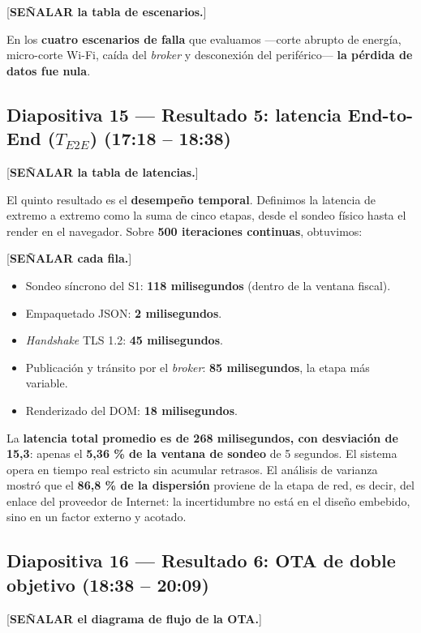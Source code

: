 \documentclass[11pt, a4paper]{article}
\begin{document}
[\textbf{SEÑALAR la tabla de escenarios.}]

En los \textbf{cuatro escenarios de falla} que evaluamos —corte abrupto de energía, micro-corte Wi-Fi, caída del \textit{broker} y desconexión del periférico— \textbf{la pérdida de datos fue nula}.

\subsection*{Diapositiva 15 — Resultado 5: latencia End-to-End ($T_{E2E}$) (17:18 – 18:38)}

[\textbf{SEÑALAR la tabla de latencias.}]

El quinto resultado es el \textbf{desempeño temporal}. Definimos la latencia de extremo a extremo como la suma de cinco etapas, desde el sondeo físico hasta el render en el navegador. Sobre \textbf{500 iteraciones continuas}, obtuvimos:

[\textbf{SEÑALAR cada fila.}]

\begin{itemize}[label=-]
    \item Sondeo síncrono del S1: \textbf{118 milisegundos} (dentro de la ventana fiscal).
    \item Empaquetado JSON: \textbf{2 milisegundos}.
    \item \textit{Handshake} TLS 1.2: \textbf{45 milisegundos}.
    \item Publicación y tránsito por el \textit{broker}: \textbf{85 milisegundos}, la etapa más variable.
    \item Renderizado del DOM: \textbf{18 milisegundos}.
\end{itemize}

La \textbf{latencia total promedio es de 268 milisegundos, con desviación de 15,3}: apenas el \textbf{5,36 \% de la ventana de sondeo} de 5 segundos. El sistema opera en tiempo real estricto sin acumular retrasos. El análisis de varianza mostró que el \textbf{86,8 \% de la dispersión} proviene de la etapa de red, es decir, del enlace del proveedor de Internet: la incertidumbre no está en el diseño embebido, sino en un factor externo y acotado.

\subsection*{Diapositiva 16 — Resultado 6: OTA de doble objetivo (18:38 – 20:09)}

[\textbf{SEÑALAR el diagrama de flujo de la OTA.}]
\end{document}
